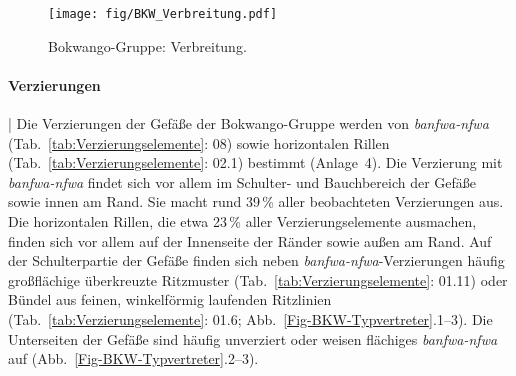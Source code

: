 \begin{figure*}[p]
	\centering
	\texttt{[image: fig/BKW\_Verbreitung.pdf]}
	\caption{Bokwango-Gruppe: Verbreitung.}
	\label{Fig-BKW_Verbreitung}
\end{figure*}

\paragraph{Verzierungen}\hspace{-.5em}|\hspace{.5em}%
Die Verzierungen der Gefäße der Bokwango-Gruppe werden von \textit{banfwa-nfwa} (Tab.~\ref{tab:Verzierungselemente}: 08) sowie horizontalen Rillen (Tab.~\ref{tab:Verzierungselemente}: 02.1) bestimmt (Anlage~4). Die Verzierung mit \textit{banfwa-nfwa} findet sich vor allem im Schulter- und Bauchbereich der Gefäße sowie innen am Rand. Sie macht rund 39\,\% aller beobachteten Verzierungen aus. Die horizontalen Rillen, die etwa 23\,\% aller Verzierungselemente ausmachen, finden sich vor allem auf der Innenseite der Ränder sowie außen am Rand. Auf der Schulterpartie der Gefäße finden sich neben \textit{banfwa-nfwa}-Verzierungen häufig großflächige überkreuzte Ritzmuster (Tab.~\ref{tab:Verzierungselemente}: 01.11) oder Bündel aus feinen, winkelförmig laufenden Ritzlinien (Tab.~\ref{tab:Verzierungselemente}: 01.6; Abb.~\ref{Fig-BKW-Typvertreter}.1--3). Die Unterseiten der Gefäße sind häufig unverziert oder weisen flächiges \textit{banfwa-nfwa} auf (Abb.~\ref{Fig-BKW-Typvertreter}.2--3).

